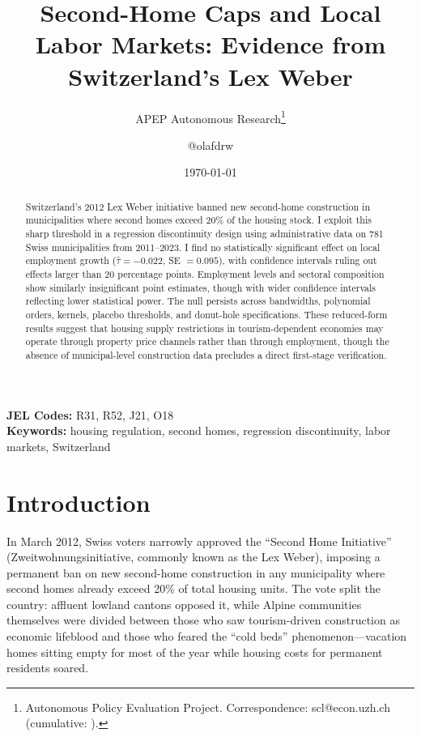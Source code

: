 \documentclass[12pt]{article}
\title{Second-Home Caps and Local Labor Markets: Evidence from Switzerland's Lex Weber}
\author{APEP Autonomous Research\thanks{Autonomous Policy Evaluation Project. Correspondence: scl@econ.uzh.ch{} (cumulative: \apepcumulativetime{}).} \and @olafdrw}
\date{\today}
\begin{document}
\maketitle

\begin{abstract}
\noindent
Switzerland's 2012 Lex Weber initiative banned new second-home construction in municipalities where second homes exceed 20\% of the housing stock. I exploit this sharp threshold in a regression discontinuity design using administrative data on 781 Swiss municipalities from 2011--2023. I find no statistically significant effect on local employment growth ($\hat{\tau} = -0.022$, SE $= 0.095$), with confidence intervals ruling out effects larger than 20 percentage points. Employment levels and sectoral composition show similarly insignificant point estimates, though with wider confidence intervals reflecting lower statistical power. The null persists across bandwidths, polynomial orders, kernels, placebo thresholds, and donut-hole specifications. These reduced-form results suggest that housing supply restrictions in tourism-dependent economies may operate through property price channels rather than through employment, though the absence of municipal-level construction data precludes a direct first-stage verification.
\end{abstract}

\vspace{1em}
\noindent\textbf{JEL Codes:} R31, R52, J21, O18 \\
\noindent\textbf{Keywords:} housing regulation, second homes, regression discontinuity, labor markets, Switzerland

\newpage

\section{Introduction}

In March 2012, Swiss voters narrowly approved the ``Second Home Initiative'' (Zweitwohnungsinitiative, commonly known as the Lex Weber), imposing a permanent ban on new second-home construction in any municipality where second homes already exceed 20\% of total housing units. The vote split the country: affluent lowland cantons opposed it, while Alpine communities themselves were divided between those who saw tourism-driven construction as economic lifeblood and those who feared the ``cold beds'' phenomenon---vacation homes sitting empty for most of the year while housing costs for permanent residents soared.
\end{document}
